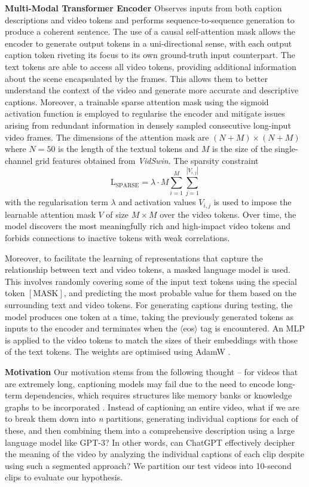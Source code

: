 \textbf{Multi-Modal Transformer Encoder} Observes inputs from both caption descriptions and video tokens and performs sequence-to-sequence generation to produce a coherent sentence. The use of a causal self-attention mask allows the encoder to generate output tokens in a uni-directional sense, with each output caption token riveting its focus to its own ground-truth input counterpart. The text tokens are able to access all video tokens, providing additional information about the scene encapsulated by the frames. This allows them to better understand the context of the video and generate more accurate and descriptive captions. Moreover, a trainable sparse attention mask using the sigmoid activation function is employed to regularise the encoder and mitigate issues arising from redundant information in densely sampled consecutive long-input video frames. The dimensions of the attention mask are $(N + M) \times (N + M)$ where $N = 50$ is the length of the textual tokens and $M$ is the size of the single-channel grid features obtained from \textit{VidSwin}. The sparsity constraint \begin{equation}
\mathrm{L_{SPARSE}} = \lambda \cdot M \sum_{i=1}^{M} \sum_{j=1}^{|V_{i,j}|}
\end{equation}
with the regularisation term $\lambda$ and activation values $V_{i,j}$ is used to impose the learnable attention mask $V$ of size $M \times M$ over the video tokens. Over time, the model discovers the most meaningfully rich and high-impact video tokens and forbids connections to inactive tokens with weak correlations.

Moreover, to facilitate the learning of representations that capture the relationship between text and video tokens, a masked language model is used. This involves randomly covering some of the input text tokens using the special token $\mathrm{[MASK]}$, and predicting the most probable value for them based on the surrounding text and video tokens. For generating captions during testing, the model produces one token at a time, taking the previously generated tokens as inputs to the encoder and terminates when the $\langle${eos}$\rangle$ tag is encountered. An MLP is applied to the video tokens to match the sizes of their embeddings with those of the text tokens. The weights are optimised using AdamW \cite{Loshchilov2017DecoupledWD}.

\textbf{Motivation}
Our motivation stems from the following thought – for videos that are extremely long, captioning models may fail due to the need to encode long-term dependencies, which requires structures like memory banks or knowledge graphs to be incorporated \cite{Pan2020SpatioTemporalGF}. Instead of captioning an entire video, what if we are to break them down into \textit{n} partitions, generating individual captions for each of these, and then combining them into a comprehensive description using a large language model like GPT-3? In other words, can ChatGPT effectively decipher the meaning of the video by analyzing the individual captions of each clip despite using such a segmented approach? We partition our test videos into 10-second clips to evaluate our hypothesis.

